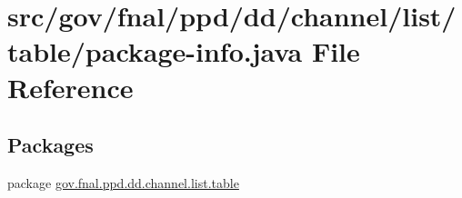 \hypertarget{gov_2fnal_2ppd_2dd_2channel_2list_2table_2package-info_8java}{\section{src/gov/fnal/ppd/dd/channel/list/table/package-\/info.java File Reference}
\label{gov_2fnal_2ppd_2dd_2channel_2list_2table_2package-info_8java}
}
\subsection*{Packages}
\begin{DoxyCompactItemize}
\item 
package \hyperlink{namespacegov_1_1fnal_1_1ppd_1_1dd_1_1channel_1_1list_1_1table}{gov.\-fnal.\-ppd.\-dd.\-channel.\-list.\-table}
\end{DoxyCompactItemize}
